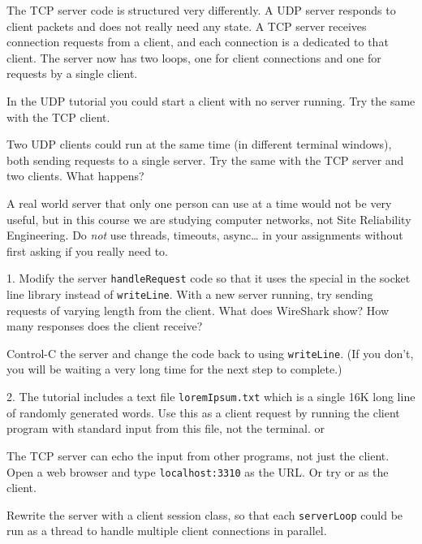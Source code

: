 The TCP server code is structured very differently. A UDP server responds
to client packets and does not really need any state. A TCP server receives
connection requests from a client, and each connection is a 
dedicated to that client. The server now has two loops, one for client connections
and one for requests by a single client.



In the UDP tutorial you could start a client with no server running. Try the
same with the TCP client.

Two UDP clients could run at the same time (in different terminal windows),
both sending requests to a single server. Try the same with the TCP server
and two clients. What happens?

\begin{IMPORTANT}
A real world server that only one person can use at a time would not be very
useful, but in this course we are studying computer networks, not Site
Reliability Engineering. Do \emph{not} use threads, timeouts, async\ldots
in your assignments without first asking if you really need to.
\end{IMPORTANT}

1. Modify the server \texttt{handleRequest} code so that it uses the special
 in the socket line library instead of \texttt{writeLine}.
With a new server running, try sending requests of varying length from the
client. What does WireShark show? How many responses does the client receive?

Control-C the server and change the code back to using \texttt{writeLine}.
(If you don't, you will be waiting a very long time for the next step to
complete.)

2. The tutorial includes a text file \texttt{loremIpsum.txt} which is a
single 16K long line of randomly generated words. Use this as a client
request by running the client program with standard input from this file,
not the terminal.
or



The TCP server can echo the input from other programs, not just the client.
Open a web browser and type \texttt{localhost:3310} as the URL.
Or try  or  as the client. 

Rewrite the server with a client session class, so that each \texttt{serverLoop}
could be run as a thread to handle multiple client connections in parallel.

\COPYRIGHT


